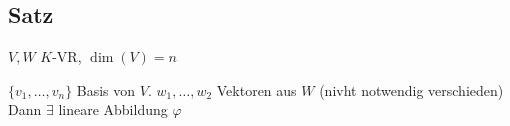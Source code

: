 \subsection{Satz}

$V,W$ $K$-VR, $\dim(V)=n$

$\{v_1, \dots, v_n\}$ Basis von $V$. $w_1,\dots, w_2 $ Vektoren aus $W$ (nivht notwendig verschieden)\\
Dann $\exists$ lineare Abbildung $\varphi$